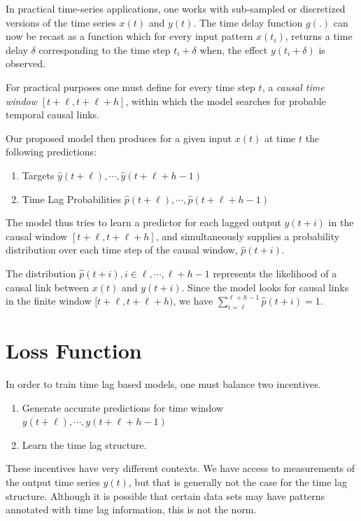 \documentclass[twoside]{article}
\begin{document}
In practical time-series applications, one works with sub-sampled or discretized versions of the time 
series $x(t)$ and $y(t)$. The time delay function $g(.)$ can now be recast as a function which for every
input pattern $x(t_i)$, returns a time delay $\delta$ corresponding to the time step $t_i + \delta$ when,
the effect $y(t_i + \delta)$ is observed.

For practical purposes one must define for every time step $t$, a \emph{causal time window} $[t+\ell, t+\ell+h]$, within which the model searches for probable temporal causal links.

Our proposed model then produces for a given input $x(t)$ at time $t$ the following predictions:

\begin{enumerate}
\item Targets $\hat{y}(t+\ell), \cdots, \hat{y}(t+\ell+h-1)$
\item Time Lag Probabilities $\hat{p}(t+\ell), \cdots, \hat{p}(t+\ell+h-1)$
\end{enumerate}

The model thus tries to learn a predictor for each lagged output $y(t+i)$ in the causal window $[t+\ell, t+\ell+h]$, and simultaneously supplies a probability distribution over each time step of the causal window, $\hat{p}(t+i)$.

The distribution $\hat{p}(t+i), i \in {\ell, \cdots, \ell+h-1}$ represents the 
likelihood of a causal link between $x(t)$ and $y(t+i)$. Since the model looks
for causal links in the finite window $[t+\ell, t+\ell+h)$, we have 
$\sum^{\ell+h-1}_{i = \ell}{\hat{p}(t + i)} = 1$.


\section{Loss Function}

In order to train time lag based models, one must balance two incentives.

\begin{enumerate}
    \item Generate accurate predictions for time window $y(t+\ell), \cdots, y(t+\ell+h-1)$
    \item Learn the time lag structure.
\end{enumerate}

These incentives have very different contexts. We have access to measurements of the output time series $y(t)$, but that is generally not the case for the time lag structure. Although it is possible that certain data sets may have patterns annotated with time lag information, this is not the norm.
\end{document}
